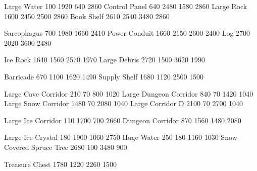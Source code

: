 \def\tilejpg{terrain-002.jpg}

  {Large Water} {100 1920 640 2860}
  {Control Panel{\qm}} {640 2480 1580 2860}
  {Large Rock{\qm}} {1600 2450 2500 2860}
  {Book Shelf} {2610 2540 3480 2860}

  {Sarcophagus} {700 1980 1660 2410}
  {Power Conduit{\qm}} { 1660 2150 2600 2400}
  {Log} { 2700 2020 3600 2480}

  {Ice Rock{\qm}} {1640 1560 2570 1970}
  {Large Debris} {2720 1500 3620 1990}

  {Barricade} {670 1100 1620 1490}
  {Supply Shelf} {1680 1120 2500 1500}

  {Large Cave Corridor{\qm}} {210 70 800 1020}
  {Large Dungeon Corridor{\qm}} {840 70 1420 1040}
  {Large Snow Corridor} {1480 70 2080 1040}
  {Large Corridor D{\qm}} {2100 70 2700 1040}

\def\tilejpg{annotated-002.jpg}

  {Large Ice Corridor{\qm}} { 110 1700 700 2660}
  {Dungeon Corridor{\qm}} { 870 1560 1480 2080}

\def\tilejpg{terrain-004.jpg}

 {Large Ice Crystal} { 180 1900 1060 2750}
 {Huge Water} {250 180 1160 1030}
 {Snow-Covered Spruce Tree{\qm}} { 2680 100 3480 900}

\def\tilejpg{treasure-000.jpg}

{\let\tilefont=\large
{} {Treasure Chest} {1780 1220 2260 1500}
}
